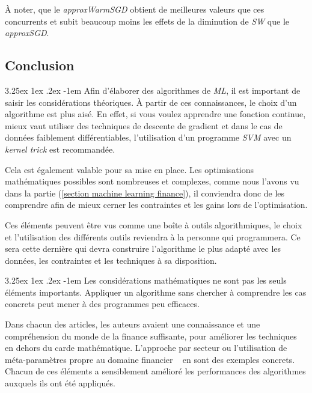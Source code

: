 \documentclass[a4paper, 11pt]{article}
\makeatletter
\renewcommand\paragraph{\@startsection{paragraph}{5}{\z@}%
  {3.25ex \@plus1ex \@minus.2ex}%
  {-1em}%
  {\normalfont\normalsize\bfseries}}
\makeatother
\begin{document}
À noter, que le \textit{approxWarmSGD} obtient de meilleures valeurs que ces concurrents et subit beaucoup moins
les effets de la diminution de \textit{SW} que le \textit{approxSGD}.

\subsection{Conclusion}
\paragraph{}
Afin d'élaborer des algorithmes de \textit{ML}, il est important de saisir les considérations théoriques.
À partir de ces connaissances, le choix d'un algorithme est plus aisé. En effet, si vous voulez apprendre une fonction
continue, mieux vaut utiliser des techniques de descente de gradient et dans le cas de données faiblement différentiables, 
l'utilisation d'un programme \textit{SVM} avec un \textit{kernel trick} est recommandée.

Cela est également valable pour sa mise en place. Les optimisations mathématiques possibles sont nombreuses et complexes,
comme nous l'avons vu dans la partie (\ref{section machine learning finance}), il conviendra donc de les comprendre afin de
mieux cerner les contraintes et les gains lors de l'optimisation.

Ces éléments peuvent être vus comme une boîte à outils algorithmiques, le choix et l'utilisation des différents
outils reviendra à la personne qui programmera. Ce sera cette dernière qui devra construire l'algorithme le plus
adapté avec les données, les contraintes et les techniques à sa disposition.

\paragraph{}
Les considérations mathématiques ne sont pas les seuls éléments importants. Appliquer un algorithme sans chercher à comprendre
les cas concrets peut mener à des programmes peu efficaces.

Dans chacun des articles, les auteurs avaient une connaissance et une compréhension du monde de la finance suffisante,
pour améliorer les techniques en dehors du carde mathématique. L'approche par secteur \cite{machine_learning_automated_trading}
ou l'utilisation de méta-paramètres propre au domaine financier ~\cite{fx_trading} en sont des exemples concrets.
Chacun de ces éléments a sensiblement amélioré les performances des algorithmes auxquels ils ont été appliqués.
\end{document}
